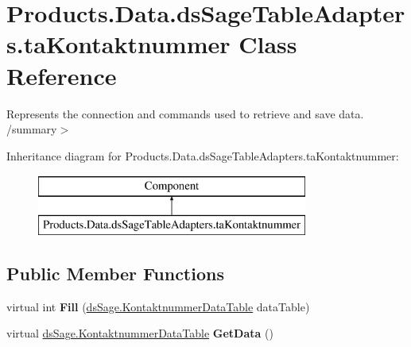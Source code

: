 \hypertarget{class_products_1_1_data_1_1ds_sage_table_adapters_1_1ta_kontaktnummer}{}\section{Products.\+Data.\+ds\+Sage\+Table\+Adapters.\+ta\+Kontaktnummer Class Reference}
\label{class_products_1_1_data_1_1ds_sage_table_adapters_1_1ta_kontaktnummer}


Represents the connection and commands used to retrieve and save data. /summary$>$  


Inheritance diagram for Products.\+Data.\+ds\+Sage\+Table\+Adapters.\+ta\+Kontaktnummer\+:\begin{figure}[H]
\begin{center}
\leavevmode
\includegraphics[height=2.000000cm]{class_products_1_1_data_1_1ds_sage_table_adapters_1_1ta_kontaktnummer}
\end{center}
\end{figure}
\subsection*{Public Member Functions}
\begin{DoxyCompactItemize}
\item 
virtual int {\bfseries Fill} (\hyperlink{class_products_1_1_data_1_1ds_sage_1_1_kontaktnummer_data_table}{ds\+Sage.\+Kontaktnummer\+Data\+Table} data\+Table)\hypertarget{class_products_1_1_data_1_1ds_sage_table_adapters_1_1ta_kontaktnummer_aae1a014e1d92ccb1cc71d3b45086fb40}{}\label{class_products_1_1_data_1_1ds_sage_table_adapters_1_1ta_kontaktnummer_aae1a014e1d92ccb1cc71d3b45086fb40}

\item 
virtual \hyperlink{class_products_1_1_data_1_1ds_sage_1_1_kontaktnummer_data_table}{ds\+Sage.\+Kontaktnummer\+Data\+Table} {\bfseries Get\+Data} ()\hypertarget{class_products_1_1_data_1_1ds_sage_table_adapters_1_1ta_kontaktnummer_a8d44a4753d1d73599c750450963678eb}{}\label{class_products_1_1_data_1_1ds_sage_table_adapters_1_1ta_kontaktnummer_a8d44a4753d1d73599c750450963678eb}

\end{DoxyCompactItemize}
